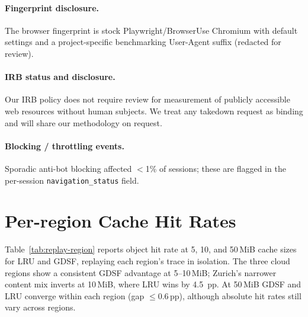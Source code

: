 \documentclass[10pt,sigconf,letterpaper,anonymous,nonacm]{acmart}
\begin{document}
\paragraph{Fingerprint disclosure.}
The browser fingerprint is stock Playwright/BrowserUse Chromium
with default settings and a project-specific benchmarking User-Agent suffix (redacted for review).

\paragraph{IRB status and disclosure.}
Our IRB policy does not require review for measurement
of publicly accessible web resources without human subjects.  We treat any
takedown request as binding and will share our methodology on request.

\paragraph{Blocking / throttling events.}
Sporadic anti-bot blocking affected $<$1\% of sessions; these are flagged in
the per-session \texttt{navigation\_status} field.

\section{Per-region Cache Hit Rates}
\label{sec:appendix-region}

Table~\ref{tab:replay-region} reports object hit rate at 5, 10, and
50\,MiB cache sizes for LRU and GDSF, replaying each region's trace
in isolation.  The three cloud regions show a consistent GDSF
advantage at 5--10\,MiB; Zurich's narrower content mix inverts at
10\,MiB, where LRU wins by 4.5~pp.  At 50\,MiB GDSF and LRU
converge within each region (gap $\leq$0.6\,pp), although absolute
hit rates still vary across regions.
\end{document}
